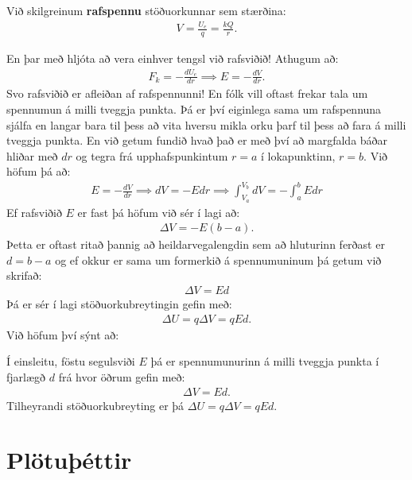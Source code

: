 \ifdefined \wholebook \else\documentclass[oneside]{book}\usepackage{EdlBook}\graphicspath{{figures/}}
\begin{document}
\begin{tcolorbox}
\begin{definition}
Við skilgreinum \textbf{rafspennu} stöðuorkunnar sem stærðina:
\begin{align*}
    V = \frac{U_e}{q} = \frac{kQ}{r}.
\end{align*}
\end{definition}
\end{tcolorbox}
En þar með hljóta að vera einhver tengsl við rafsviðið! Athugum að:
\begin{align*}
    F_k = -\frac{dU_e}{dr} \implies E = - \frac{dV}{dr}.
\end{align*}
Svo rafsviðið er afleiðan af rafspennunni! En fólk vill oftast frekar tala um spennumun á milli tveggja punkta. Þá er því eiginlega sama um rafspennuna sjálfa en langar bara til þess að vita hversu mikla orku þarf til þess að fara á milli tveggja punkta. En við getum fundið hvað það er með því að margfalda báðar hliðar með $dr$ og tegra frá upphafspunkintum $r = a$ í lokapunktinn, $r=b$. Við höfum þá að:
\begin{align*}
    E = -\frac{dV}{dr} \implies dV = -Edr \implies \int_{V_a}^{V_b} dV = -\int_{a}^{b} E dr
\end{align*}
Ef rafsviðið $E$ er fast þá höfum við sér í lagi að:
\begin{align*}
    \Delta V = -E(b-a).
\end{align*}
Þetta er oftast ritað þannig að heildarvegalengdin sem að hluturinn ferðast er $d = b-a$ og ef okkur er sama um formerkið á spennumuninum þá getum við skrifað:
\begin{align*}
    \Delta V = Ed
\end{align*}
Þá er sér í lagi stöðuorkubreytingin gefin með:
\begin{align*}
    \Delta U = q\Delta V = qEd.
\end{align*}
Við höfum því sýnt að:
\begin{tcolorbox}
\begin{theorem}
Í einsleitu, föstu segulsviði $E$ þá er spennumunurinn á milli tveggja punkta í fjarlægð $d$ frá hvor öðrum gefin með:
\begin{align*}
    \Delta V = Ed.
\end{align*}
Tilheyrandi stöðuorkubreyting er þá $\Delta U = q\Delta V = qEd$.
\end{theorem}
\end{tcolorbox}


\section{Plötuþéttir}
\end{document}
